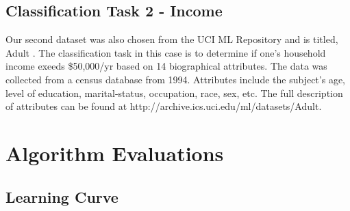 \documentclass{sig-alternate}
\begin{document}
\subsection{Classification Task 2 - Income}

Our second dataset was also chosen from the UCI ML Repository and is titled, Adult \cite{Bache+Lichman:2013}. The classification task in this case is to determine if one's household income exeeds \$50,000/yr based on 14 biographical attributes. The data was collected from a census database from 1994. Attributes include the subject's age, level of education, marital-status, occupation, race, sex, etc. The full description of attributes can be found at http://archive.ics.uci.edu/ml/datasets/Adult.



\section{Algorithm Evaluations}

\subsection{Learning Curve}

\begin{figure}[test-error]
\centering



\end{figure}
\end{document}
